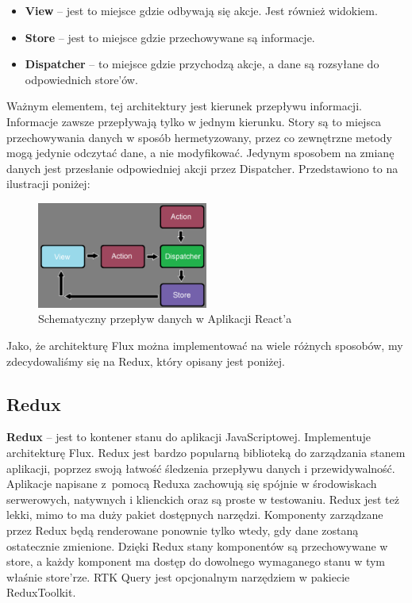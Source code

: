 \documentclass[a4paper,twoside,12pt]{book}
\begin{document}
\begin{itemize}
    \item \textbf{View} -- jest to miejsce gdzie odbywają się akcje. Jest również widokiem.
    \item \textbf{Store} -- jest to miejsce gdzie przechowywane są informacje.
    \item \textbf{Dispatcher} -- to miejsce gdzie przychodzą akcje, a dane są rozsyłane do odpowiednich store’ów.
\end{itemize}

Ważnym elementem, tej architektury jest kierunek przepływu informacji. Informacje zawsze przepływają tylko w jednym kierunku. Story są to miejsca przechowywania danych w sposób hermetyzowany, przez co zewnętrzne metody mogą jedynie odczytać dane, a nie modyfikować. Jedynym sposobem na zmianę danych jest przesłanie odpowiedniej akcji przez Dispatcher.
Przedstawiono to na ilustracji poniżej:

\begin{figure}[H]
    \centering
    \includegraphics[width=0.5\textwidth]{webowka_ss/Flux.png}
    \caption{Schematyczny przepływ danych w Aplikacji React'a}
\end{figure}

Jako, że architekturę Flux można implementować na wiele różnych sposobów, my zdecydowaliśmy się na Redux, który opisany jest poniżej.

\subsection{Redux}
\textbf{Redux} -- jest to kontener stanu do aplikacji JavaScriptowej. Implementuje architekturę Flux. Redux jest bardzo popularną biblioteką do zarządzania stanem aplikacji, poprzez swoją łatwość śledzenia przepływu danych i przewidywalność. Aplikacje napisane z~pomocą Reduxa zachowują się spójnie w środowiskach serwerowych, natywnych i klienckich oraz są proste w testowaniu. Redux jest też lekki, mimo to ma duży pakiet dostępnych narzędzi. Komponenty zarządzane przez Redux będą renderowane ponownie tylko wtedy, gdy dane zostaną ostatecznie zmienione. Dzięki Redux stany komponentów są przechowywane w store, a każdy komponent ma dostęp do dowolnego wymaganego stanu w tym właśnie store’rze. RTK Query jest opcjonalnym narzędziem w pakiecie ReduxToolkit. 
\end{document}
